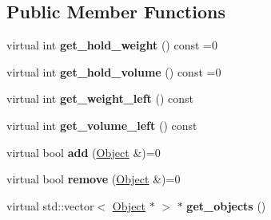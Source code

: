 \subsection*{Public Member Functions}
\begin{DoxyCompactItemize}
\item 
\hypertarget{classda__game_1_1Container_a8791f5bdac70b65d978ac0184ed48525}{
virtual int {\bfseries get\_\-hold\_\-weight} () const =0}
\label{classda__game_1_1Container_a8791f5bdac70b65d978ac0184ed48525}

\item 
\hypertarget{classda__game_1_1Container_a884311719474a432f186dfc803e15873}{
virtual int {\bfseries get\_\-hold\_\-volume} () const =0}
\label{classda__game_1_1Container_a884311719474a432f186dfc803e15873}

\item 
\hypertarget{classda__game_1_1Container_a32807c145257173e5bb2948c8a7d5207}{
virtual int {\bfseries get\_\-weight\_\-left} () const }
\label{classda__game_1_1Container_a32807c145257173e5bb2948c8a7d5207}

\item 
\hypertarget{classda__game_1_1Container_a1fb472908ed21d8268caa65374e195b4}{
virtual int {\bfseries get\_\-volume\_\-left} () const }
\label{classda__game_1_1Container_a1fb472908ed21d8268caa65374e195b4}

\item 
\hypertarget{classda__game_1_1Container_a37fab4911cc993db3f4e26c4e6e95eba}{
virtual bool {\bfseries add} (\hyperlink{classda__game_1_1Object}{Object} \&)=0}
\label{classda__game_1_1Container_a37fab4911cc993db3f4e26c4e6e95eba}

\item 
\hypertarget{classda__game_1_1Container_a8bb5c906abd5f6df854e6eab8831305e}{
virtual bool {\bfseries remove} (\hyperlink{classda__game_1_1Object}{Object} \&)=0}
\label{classda__game_1_1Container_a8bb5c906abd5f6df854e6eab8831305e}

\item 
\hypertarget{classda__game_1_1Container_a77eaf77a8ae8f4ddc16067102379f357}{
virtual std::vector$<$ \hyperlink{classda__game_1_1Object}{Object} $\ast$ $>$ $\ast$ {\bfseries get\_\-objects} ()}
\label{classda__game_1_1Container_a77eaf77a8ae8f4ddc16067102379f357}

\end{DoxyCompactItemize}
